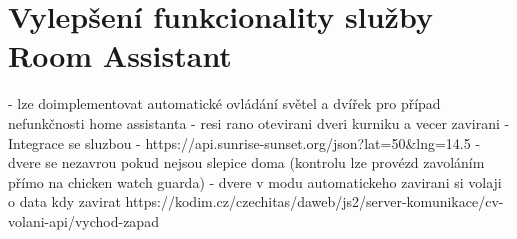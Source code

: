 \section{Vylepšení funkcionality služby Room Assistant}\label{sec:vylepseni-funkcionality-sluzby-room-assistant}

- lze doimplementovat automatické ovládání světel a dvířek pro případ nefunkčnosti home assistanta
- resi rano otevirani dveri kurniku a vecer zavirani
- Integrace se sluzbou  - https://api.sunrise-sunset.org/json?lat=50\&lng=14.5
- dvere se nezavrou pokud nejsou slepice doma (kontrolu lze provézd zavoláním přímo na chicken watch guarda)
- dvere v modu automatickeho zavirani si volaji o data kdy zavirat https://kodim.cz/czechitas/daweb/js2/server-komunikace/cv-volani-api/vychod-zapad